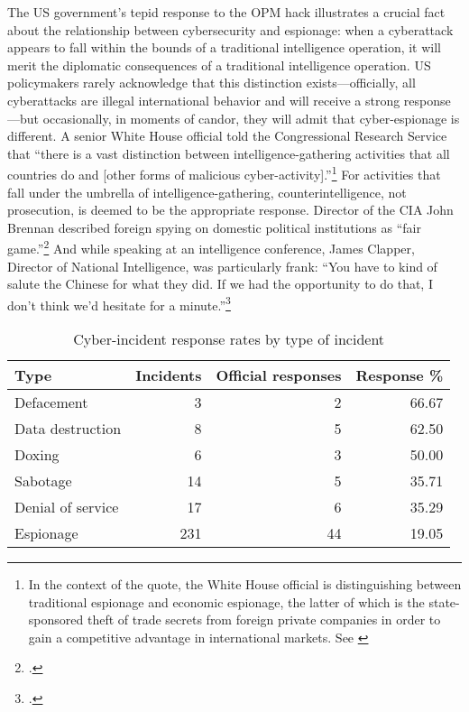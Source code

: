 \documentclass[14pt]{extarticle}
\begin{document}
The US government's tepid response to the OPM hack illustrates a crucial fact about the relationship between cybersecurity and espionage: when a cyberattack appears to fall within the bounds of a traditional intelligence operation, it will merit the diplomatic consequences of a traditional intelligence operation. US policymakers rarely acknowledge that this distinction exists---officially, all cyberattacks are illegal international behavior and will receive a strong response---but occasionally, in moments of candor, they will admit that cyber-espionage is different. A senior White House official told the Congressional Research Service that \enquote{there is a vast distinction between intelligence-gathering activities that all countries do and [other forms of malicious cyber-activity].}\footnote{In the context of the quote, the White House official is distinguishing between traditional espionage and economic espionage, the latter of which is the state-sponsored theft of trade secrets from foreign private companies in order to gain a competitive advantage in international markets. See \cite{finklea_cyber_2015}} For activities that fall under the umbrella of intelligence-gathering, counterintelligence, not prosecution, is deemed to be the appropriate response. Director of the CIA John Brennan described foreign spying on domestic political institutions as \enquote{fair game.}\footcite{sanger_u.s._2016} And while speaking at an intelligence conference, James Clapper, Director of National Intelligence, was particularly frank: \enquote{You have to kind of salute the Chinese for what they did. If we had the opportunity to do that, I don’t think we’d hesitate for a minute.}\footcite{pepitone_clapper_2015}

\begin{table}[ht]
\centering
\begin{tabular}{lrrr}
  \hline
Type & Incidents & Official responses & Response \% \\
  \hline
Defacement &   3 &   2 & 66.67 \\
  Data destruction &   8 &   5 & 62.50 \\
  Doxing &   6 &   3 & 50.00 \\
  Sabotage &  14 &   5 & 35.71 \\
  Denial of service &  17 &   6 & 35.29 \\
  Espionage & 231 &  44 & 19.05 \\
   \hline
\end{tabular}
\caption{Cyber-incident response rates by type of incident}
\label{response-pct}
\end{table}
\end{document}
